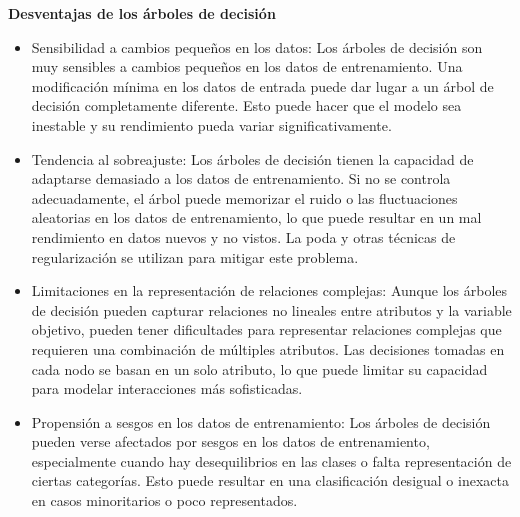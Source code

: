\textbf{Desventajas de los árboles de decisión}
\begin{itemize}
    \item Sensibilidad a cambios pequeños en los datos: Los árboles de decisión son muy sensibles a cambios pequeños en los datos de entrenamiento. Una modificación mínima en los datos de entrada puede dar lugar a un árbol de decisión completamente diferente. Esto puede hacer que el modelo sea inestable y su rendimiento pueda variar significativamente.
    \item Tendencia al sobreajuste: Los árboles de decisión tienen la capacidad de adaptarse demasiado a los datos de entrenamiento. Si no se controla adecuadamente, el árbol puede memorizar el ruido o las fluctuaciones aleatorias en los datos de entrenamiento, lo que puede resultar en un mal rendimiento en datos nuevos y no vistos. La poda y otras técnicas de regularización se utilizan para mitigar este problema.
    \item Limitaciones en la representación de relaciones complejas: Aunque los árboles de decisión pueden capturar relaciones no lineales entre atributos y la variable objetivo, pueden tener dificultades para representar relaciones complejas que requieren una combinación de múltiples atributos. Las decisiones tomadas en cada nodo se basan en un solo atributo, lo que puede limitar su capacidad para modelar interacciones más sofisticadas.
    \item Propensión a sesgos en los datos de entrenamiento: Los árboles de decisión pueden verse afectados por sesgos en los datos de entrenamiento, especialmente cuando hay desequilibrios en las clases o falta representación de ciertas categorías. Esto puede resultar en una clasificación desigual o inexacta en casos minoritarios o poco representados.
\end{itemize}